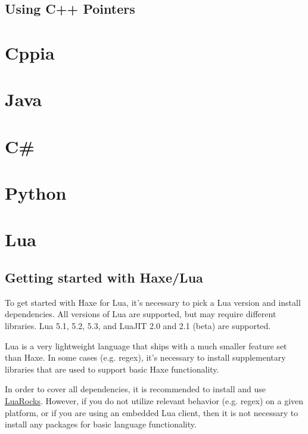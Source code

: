 \subsection{Using C++ Pointers}
\label{target-cpp-pointers}


\section{Cppia}
\label{target-cppia}

\section{Java}
\label{target-java}

\section{C\#}
\label{target-cs}

\section{Python}
\label{target-python}



\section{Lua}
\label{target-lua}

\subsection{Getting started with Haxe/Lua}
\label{target-lua-getting-started}

To get started with Haxe for Lua, it's necessary to pick a Lua version and install
dependencies.  All versions of Lua are supported, but may require different
libraries.  Lua 5.1, 5.2, 5.3, and LuaJIT 2.0 and 2.1 (beta) are supported.

Lua is a very lightweight language that ships with a much smaller  feature set
than Haxe.  In some cases (e.g. regex), it's necessary to install supplementary
libraries that are used to support basic Haxe functionality.

In order to cover all dependencies, it is recommended to install and use
\href{https://github.com/luarocks/luarocks/wiki/Download}{LuaRocks}.  However,
if you do not utilize relevant behavior (e.g. regex) on a given platform,
or if you are using an embedded Lua client, then it is not necessary to
install any packages for basic language functionality.

